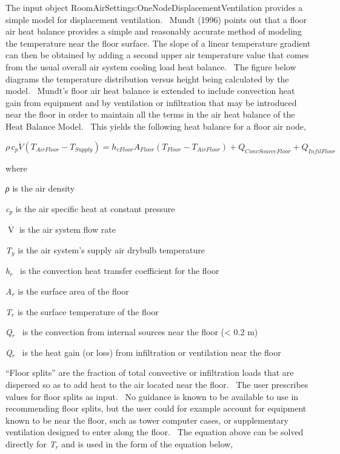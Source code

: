 The input object RoomAirSettings:OneNodeDisplacementVentilation provides a simple model for displacement ventilation.~ Mundt (1996) points out that a floor air heat balance provides a simple and reasonably accurate method of modeling the temperature near the floor surface. The slope of a linear temperature gradient can then be obtained by adding a second upper air temperature value that comes from the usual overall air system cooling load heat balance.~ The figure below diagrams the temperature distribution versus height being calculated by the model.~ Mundt's floor air heat balance is extended to include convection heat gain from equipment and by ventilation or infiltration that may be introduced near the floor in order to maintain all the terms in the air heat balance of the Heat Balance Model.~ This yields the following heat balance for a floor air node,

\begin{equation}
\rho \,{c_p}\dot V({T_{AirFloor}} - {T_{Supply}}) = {h_{cFloor}}{A_{Floor}}({T_{Floor}} - {T_{AirFloor}}) + {Q_{ConvSourceFloor}} + {Q_{InfilFloor}}
\end{equation}

where

\emph{ρ} is the air density

\emph{c\(_{p}\)} is the air specific heat at constant pressure

\(\mathop V\limits^\cdot\) is the air system flow rate

\emph{T\(_{y}\)} is the air system's supply air drybulb temperature

\emph{h\(_{r}\)} ~is the convection heat transfer coefficient for the floor

\emph{A\(_{r}\)} is the surface area of the floor

\emph{T\(_{r}\)} is the surface temperature of the floor

\emph{Q\(_{r}\)~} is the convection from internal sources near the floor (\textless{} 0.2 m)

\emph{Q\(_{r}\)}~ is the heat gain (or loss) from infiltration or ventilation near the floor

``Floor splits'' are the fraction of total convective or infiltration loads that are dispersed so as to add heat to the air located near the floor.~ The user prescribes values for floor splits as input.~ No guidance is known to be available to use in recommending floor splits, but the user could for example account for equipment known to be near the floor, such as tower computer cases, or supplementary ventilation designed to enter along the floor.~ The equation above can be solved directly for \emph{T\(_{r}\)} and is used in the form of the equation below,


